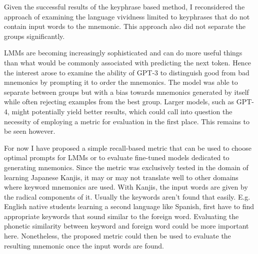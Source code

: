 Given the successful results of the keyphrase based method, I reconsidered the approach of examining the language vividness limited to keyphrases that do not contain input words to the mnemonic. This approach also did not separate the groups significantly.

LMMs are becoming increasingly sophisticated and can do more useful things than what would be commonly associated with predicting the next token. Hence the interest arose to examine the ability of GPT-3 to distinguish good from bad mnemonics by prompting it to order the mnemonics. The model was able to separate between groups but with a bias towards mnemonics generated by itself while often rejecting examples from the best group. Larger models, such as GPT-4, might potentially yield better results, which could call into question the necessity of employing a metric for evaluation in the first place. This remains to be seen however.

For now I have proposed a simple recall-based metric that can be used to choose optimal prompts for LMMs or to evaluate fine-tuned models dedicated to generating mnemonics. Since the metric was exclusively tested in the domain of learning Japanese Kanjis, it may or may not translate well to other domains where keyword mnemonics are used. With Kanjis, the input words are given by the radical components of it. Usually the keywords aren't found that easily. E.g. English native students learning a second language like Spanish, first have to find appropriate keywords that sound similar to the foreign word. Evaluating the phonetic similarity between keyword and foreign word could be more important here.
Nonetheless, the proposed metric could then be used to evaluate the resulting mnemonic once the input words are found.   


